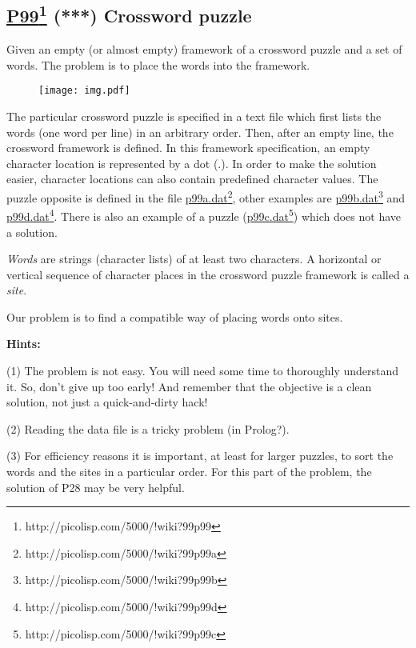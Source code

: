 \documentclass[10pt,a4paper]{article}
\begin{document}
\subsection*{\underline{P99}\footnote{http://picolisp.com/5000/!wiki?99p99} (***) Crossword puzzle}
Given an empty (or almost empty) framework of a crossword puzzle and
a set of words. The problem is to place the words into the framework.

\begin{figure}[h]
\begin{flushleft}
\texttt{[image: img.pdf]}
\end{flushleft}
\end{figure}


The particular crossword puzzle is specified in a text file which
first lists the words (one word per line) in an arbitrary order. Then,
after an empty line, the crossword framework is defined. In this
framework specification, an empty character location is represented
by a dot (.). In order to make the solution easier, character locations
can also contain predefined character values. The puzzle opposite
is defined in the file \underline{p99a.dat}\footnote{http://picolisp.com/5000/!wiki?99p99a}, other examples
are \underline{p99b.dat}\footnote{http://picolisp.com/5000/!wiki?99p99b} and \underline{p99d.dat}\footnote{http://picolisp.com/5000/!wiki?99p99d}.
There is also an example of a puzzle (\underline{p99c.dat}\footnote{http://picolisp.com/5000/!wiki?99p99c})
which does not have a solution.

\textit{Words} are strings (character lists) of at least two characters.
A horizontal or vertical sequence of character places in the
crossword puzzle framework is called a \textit{site}.

Our problem is to find a compatible way of placing words onto sites.

\textbf{Hints:}

(1) The problem is not easy. You will need some time to
thoroughly understand it. So, don't give up too early! And remember
that the objective is a clean solution, not just a quick-and-dirty hack!

(2) Reading the data file is a tricky problem (in Prolog?).

(3) For efficiency reasons it is important, at least for
larger puzzles, to sort the words and the sites in a particular order.
For this part of the problem, the solution of P28 may be very helpful.
\end{document}
